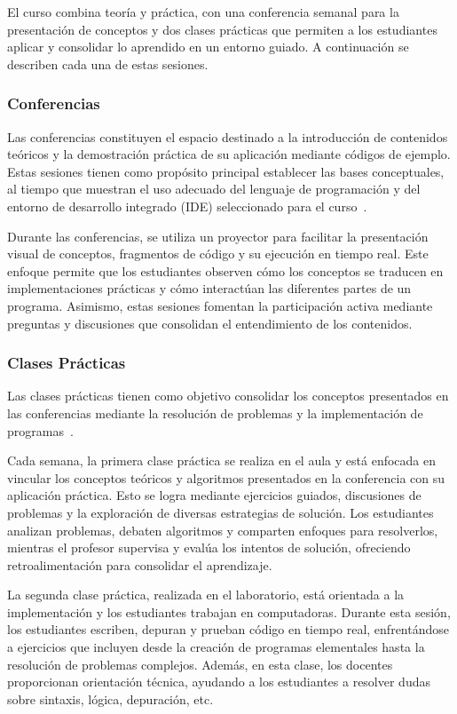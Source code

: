 \documentclass{article}
\begin{document}
El curso combina teoría y práctica, con una conferencia semanal para la presentación de conceptos y dos clases prácticas que permiten a los estudiantes aplicar y consolidar lo aprendido en un entorno guiado. A continuación se describen cada una de estas sesiones.

\subsubsection{Conferencias}

Las conferencias constituyen el espacio destinado a la introducción de contenidos teóricos y la demostración práctica de su aplicación mediante códigos de ejemplo. Estas sesiones tienen como propósito principal establecer las bases conceptuales, al tiempo que muestran el uso adecuado del lenguaje de programación y del entorno de desarrollo integrado (IDE) seleccionado para el curso~\cite{plan_estudio_e_2017}.

Durante las conferencias, se utiliza un proyector para facilitar la presentación visual de conceptos, fragmentos de código y su ejecución en tiempo real. Este enfoque permite que los estudiantes observen cómo los conceptos se traducen en implementaciones prácticas y cómo interactúan las diferentes partes de un programa. Asimismo, estas sesiones fomentan la participación activa mediante preguntas y discusiones que consolidan el entendimiento de los contenidos.

\subsubsection{Clases Prácticas}

Las clases prácticas tienen como objetivo consolidar los conceptos presentados en las conferencias mediante la resolución de problemas y la implementación de programas~\cite{plan_estudio_e_2017}.

Cada semana, la primera clase práctica se realiza en el aula y está enfocada en vincular los conceptos teóricos y algoritmos presentados en la conferencia con su aplicación práctica. Esto se logra mediante ejercicios guiados, discusiones de problemas y la exploración de diversas estrategias de solución. Los estudiantes analizan problemas, debaten algoritmos y comparten enfoques para resolverlos, mientras el profesor supervisa y evalúa los intentos de solución, ofreciendo retroalimentación para consolidar el aprendizaje.

La segunda clase práctica, realizada en el laboratorio, está orientada a la implementación y los estudiantes trabajan en computadoras. Durante esta sesión, los estudiantes escriben, depuran y prueban código en tiempo real, enfrentándose a ejercicios que incluyen desde la creación de programas elementales hasta la resolución de problemas complejos. Además, en esta clase, los docentes proporcionan orientación técnica, ayudando a los estudiantes a resolver dudas sobre sintaxis, lógica, depuración, etc. 
\end{document}
